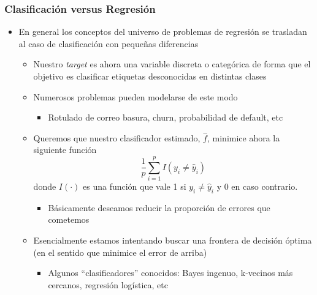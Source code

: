 \documentclass[leqno, 10pt, envcountsect]{beamer}
\numberwithin{equation}{section}
\theoremstyle{definition}
\theoremstyle{example}
\numberwithin{figure}{section}
\numberwithin{table}{section}
\let\olditem\item
\renewcommand{\item}{%
\olditem\vspace{1pt}}
\begin{document}
\begin{frame}
  \frametitle{Clasificación versus Regresión}
\begin{itemize}
  \item En general los conceptos del universo de problemas de regresión se
    trasladan al caso de clasificación con pequeñas diferencias
    \begin{itemize}
      \item Nuestro \textit{target} es ahora una variable discreta o
        categórica de forma que el objetivo es clasificar etiquetas
        desconocidas en distintas clases
      \item Numerosos problemas pueden modelarse de este modo
        \begin{itemize}
          \item Rotulado de correo basura, churn, probabilidad de default, etc
        \end{itemize}
      \item Queremos que nuestro clasificador estimado, $\hat{f}$, minimice
        ahora la siguiente función
      \begin{equation*}
        \frac{1}{p}\sum_{i=1}^{p}I(y_{i} \not = \hat{y}_{i})
      \end{equation*}
      donde $I(\cdot)$ es una función que vale 1 si $y_{i} \not = \hat{y}_{i}$
        y 0 en caso contrario.
        \begin{itemize}
          \item Básicamente deseamos reducir la proporción de errores que
            cometemos
        \end{itemize}
      \item Esencialmente estamos intentando buscar una frontera de decisión
        óptima (en el sentido que minimice el error de arriba)
        \begin{itemize}
          \item Algunos \enquote{clasificadores} conocidos: Bayes ingenuo,
            k-vecinos más cercanos, regresión logística, etc
        \end{itemize}
    \end{itemize}
\end{itemize}
\begin{center}

\end{center}
\end{frame}
\end{document}

